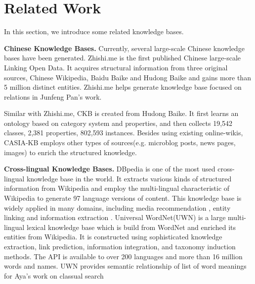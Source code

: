 \documentclass[runningheads,a4paper]{llncs}
\newcommand{\para}[1]{\vspace{0.1cm}\noindent\textbf{#1}}
\begin{document}
\section{Related Work}
\label{sec:work}
In this section, we introduce some related knowledge bases. %

\para{Chinese Knowledge Bases.} Currently, several large-scale Chinese knowledge bases have been generated. Zhishi.me\cite{niu2011zhishi,wang2014publishing} is the first published Chinese large-scale Linking Open Data. It acquires structural information from three original sources, Chinese Wikipedia, Baidu Baike and Hudong Baike and gains more than 5 million distinct entities. Zhishi.me helps generate knowledge base focused on relations in Junfeng Pan's work\cite{pan2012building}.

Similar with Zhishi.me, CKB\cite{wang2012building} is created from Hudong Baike. It first learns an ontology based on category system and properties, and then collects 19,542 classes, 2,381 properties, 802,593 instances. Besides using existing online-wikis, CASIA-KB employs other types of sources(e.g. microblog posts, news pages, images) to enrich the structured knowledge.

\para{Cross-lingual Knowledge Bases.} DBpedia \cite{auer2007dbpedia,mendes2012dbpedia} is one of the most used cross-lingual knowledge base in the world. It extracts various kinds of structured information from Wikipedia and employ the multi-lingual characteristic of Wikipedia to generate 97 language versions of content. This knowledge base is widely applied in many domains, including media recommendation \cite{fernandez2011generic,kaminskas2012knowledge}, entity linking\cite{mendes2011evaluating} and information extraction \cite{dutta2013integrating}. Universal WordNet(UWN)\cite{de2012uwn} is a large multi-lingual lexical knowledge base which is build from WordNet and enriched its entities from Wikipedia. It is constructed using sophisticated knowledge extraction, link prediction, information integration, and taxonomy induction methods. The API is available to over 200 languages and more than 16 million words and names. UWN provides semantic relationship of list of word meanings for Aya's work on classual search \cite{al2015conceptual}

\end{document}

